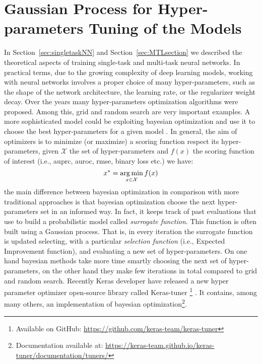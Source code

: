 \section{Gaussian Process for Hyper-parameters Tuning of the Models}
\label{sec:gaussianprocess}
In Section~\ref{sec:singletaskNN} and Section~\ref{sec:MTLsection} we
described the theoretical aspects of training single-task and multi-task neural networks. In practical terms, due to the
growing complexity of deep learning models, working with neural networks
involves a proper choice of many hyper-parameters, such as the shape of
the network architecture, the learning rate, or the regularizer weight
decay. Over the years many hyper-parameters optimization algorithms were
proposed. Among this, grid and random search \cite{BergstraB12} are very important examples. A more sophisticated model could be exploiting bayesian optimization
and use it to choose the best hyper-parameters for a given model
\cite{SnoekGP}. In general, the aim of optimizers is to minimize (or
maximize) a scoring function respect its hyper-parameters, given
$\mathcal{X}$ the set of hyper-parameters and $f(x)$ the scoring function of interest
(i.e., auprc, auroc, rmse, binary loss etc.) we have: 
\[ 
x^* =  \operatorname*{arg\,min}_{x \in \mathcal{X}} f(x) 
\]
the main difference between bayesian optimization in comparison with more
traditional approaches is that bayesian optimization choose the next
hyper-parameters set in an informed way. In fact, it keeps track of past evaluations
that use to build a probabilistic model called \emph{surrogate function}. This function is often built using a Gaussian process. That is, in every
iteration the surrogate function is updated selecting, with a particular
\emph{selection function} (i.e., Expected Improvement function), and
evaluating a new set of hyper-parameters. On one hand bayesian methods
take more time smartly choosing the next set of hyper-parameters, on the other hand they make few iterations in total compared to grid and random search. 
Recently Keras developer have released a new hyper parameter optimizer
open-source library called Keras-tuner \footnote{Available on GitHub:
\url{https://github.com/keras-team/keras-tuner}}
\cite{omalley2019kerastuner}. It contains, among many others, an
implementation of bayesian optimization\footnote{Documentation available
at: \url{https://keras-team.github.io/keras-tuner/documentation/tuners/}}.

